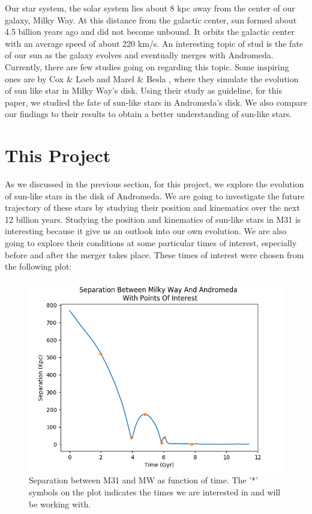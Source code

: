 \documentclass[iop]{emulateapj}
\begin{document}
    Our star system, the solar system lies about 8 kpc away from the center of our galaxy, Milky Way. At this distance from the galactic center, sun formed about 4.5 billion years ago and did not become unbound. It orbits the galactic center with an average speed of about 220 km/s. An interesting topic of stud is the fate of our sun as the galaxy evolves and eventually merges with Andromeda. Currently, there are few studies going on regarding this topic. Some inspiring ones are by Cox \& Loeb \cite{cl08} and Marel \& Besla \cite{marel}, where they simulate the evolution of sun like star in Milky Way's disk. Using their study as guideline, for this paper, we studied the fate of sun-like stars in Andromeda's disk. We also compare our findings to their \cite{cl08} \cite{marel} results to obtain a better understanding of sun-like stars. \medskip
    
    
\section{This Project}

    
    As we discussed in the previous section, for this project, we explore the evolution of sun-like stars in the disk of Andromeda. We are going to investigate the future trajectory of these stars by studying their position and kinematics over the next 12 billion years. Studying the position and kinematics of sun-like stars in M31 is interesting because it give us an outlook into our own evolution. We are also going to explore their conditions at some particular times of interest, especially before and after the merger takes place. These times of interest were chosen from the following plot: \medskip
    
    \begin{figure}[h]
        \centering
        \includegraphics[width=\columnwidth]{separation}
        \caption{Separation between M31 and MW as function of time. The '*' symbols on the plot indicates the times we are interested in and will be working with.}
        \label{fig:separation}
    \end{figure}
    
\end{document}
